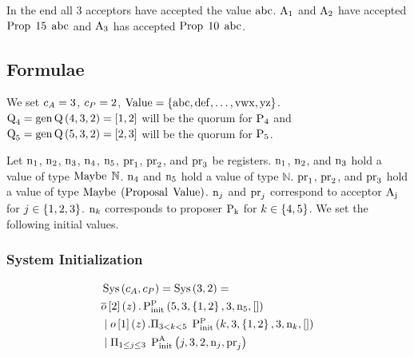 In the end all $3$ acceptors have accepted the value $\operatorname{abc}$.
$\operatorname{A_{1}}$ and $\operatorname{A_{2}}$ have accepted $\operatorname{Prop}\; 15\; \operatorname{abc}$ and $\operatorname{A_{3}}$ has accepted $\operatorname{Prop}\; 10\; \operatorname{abc}$.

\subsection{Formulae}
We set $c_A = 3$, $c_P = 2$,
$\operatorname{Value}=\left\{\operatorname{abc}, \operatorname{def}, \ldots, \operatorname{vwx}, \operatorname{yz}\right\}$.
$\operatorname{Q}_4 = \operatorname{gen\operatorname{Q}}\left(4, 3, 2\right) = \left[1,2\right]$ will be the quorum for $\operatorname{P_{4}}$ and $\operatorname{Q}_5 = \operatorname{gen\operatorname{Q}}\left(5, 3, 2\right) = \left[2,3\right]$ will be the quorum for $\operatorname{P_{5}}$.

Let $\operatorname{n}_1$, $\operatorname{n}_2$, $\operatorname{n}_3$, $\operatorname{n}_4$, $\operatorname{n}_5$, $\operatorname{pr}_1$, $\operatorname{pr}_2$, and $\operatorname{pr}_3$ be registers.
$\operatorname{n}_1$, $\operatorname{n}_2$, and $\operatorname{n}_3$ hold a value of type $\operatorname{Maybe}\; \mathbb{N}$.
$\operatorname{n}_4$ and $\operatorname{n}_5$ hold a value of type $\mathbb{N}$.
$\operatorname{pr}_1$, $\operatorname{pr}_2$, and $\operatorname{pr}_3$ hold a value of type $\operatorname{Maybe}\; \left(\operatorname{Proposal}\; \operatorname{Value}\right)$.
$\operatorname{n}_{j}$ and $\operatorname{pr}_{j}$ correspond to acceptor $\operatorname{A_{j}}$ for $j \in \left\{1, 2, 3\right\}$.
$\operatorname{n}_{k}$ corresponds to proposer $\operatorname{P_{k}}$ for $k \in \left\{4, 5\right\}$.
We set the following initial values.


\subsubsection{System Initialization}
\begin{align*}
&\operatorname{Sys}\left(c_A, c_P\right) = \operatorname{Sys}\left(3, 2\right) =\\
&\overline{o}\left[2\right]\left(z\right).\textstyle\operatorname{P^{P}_{init}}\left(5, 3, \left\{1, 2\right\}, 3, \operatorname{n}_5, \mathtt{[]}\right)\\
&\; | \; o\left[1\right]\left(z\right).\Pi_{3 < k < 5}\; \textstyle\operatorname{P^{P}_{init}}\left(k, 3, \left\{1, 2\right\}, 3, \operatorname{n}_{k}, \mathtt{[]}\right)\\
&\; | \; \Pi_{1 \le j \le 3}\; \operatorname{P^{A}_{init}}\left(j, 3, 2, \operatorname{n}_{j}, \operatorname{pr}_{j}\right)
\end{align*}

